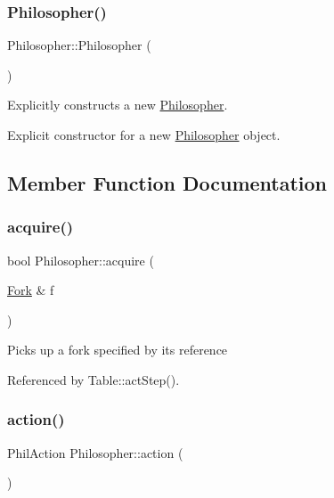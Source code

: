\subsubsection{\texorpdfstring{Philosopher()}{Philosopher()}}
{\footnotesize\ttfamily Philosopher\+::\+Philosopher (\begin{DoxyParamCaption}{ }\end{DoxyParamCaption})}



Explicitly constructs a new \hyperlink{class_philosopher}{Philosopher}. 

Explicit constructor for a new \hyperlink{class_philosopher}{Philosopher} object. 

\subsection{Member Function Documentation}
\mbox{\label{class_philosopher_a7658c8e95d7895246251b494b033d2e3}} 
\subsubsection{\texorpdfstring{acquire()}{acquire()}}
{\footnotesize\ttfamily bool Philosopher\+::acquire (\begin{DoxyParamCaption}\item[{\hyperlink{struct_fork}{Fork} \&}]{f }\end{DoxyParamCaption})}

Picks up a fork specified by its reference 

Referenced by Table\+::act\+Step().

\mbox{\label{class_philosopher_a0e6078cacfe93f71cc7f027e0b3a8971}} 
\subsubsection{\texorpdfstring{action()}{action()}}
{\footnotesize\ttfamily Phil\+Action Philosopher\+::action (\begin{DoxyParamCaption}{ }\end{DoxyParamCaption})\hspace{0.3cm}{\ttfamily [inline]}}

